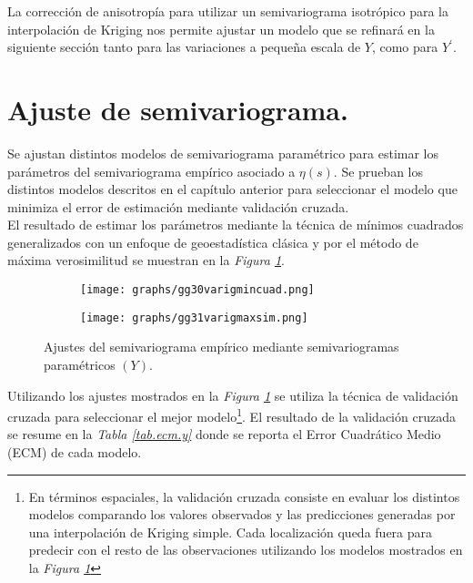 \documentclass[11pt, oneside]{book}
\begin{document}
La corrección de anisotropía para utilizar un semivariograma isotrópico para la interpolación de Kriging nos permite ajustar un modelo que se refinará en la siguiente sección tanto para las variaciones a pequeña escala de $Y$, como para $Y^{'}$.

\newpage

\section{Ajuste de semivariograma.}
Se ajustan distintos modelos de semivariograma paramétrico para estimar los parámetros del semivariograma empírico asociado a $\eta(s)$. Se prueban los distintos modelos descritos en el capítulo anterior para seleccionar el modelo que minimiza el error de estimación mediante validación cruzada.\\

El resultado de estimar los parámetros mediante la técnica de mínimos cuadrados generalizados con un enfoque de geoestadística clásica y por el método de máxima verosimilitud se muestran en la \emph{Figura \ref{fig30y31.ajusvary}}.

  \begin{figure}[ht]
  \begin{subfigure}{.5\textwidth}
	  \centering
	  \texttt{[image: graphs/gg30varigmincuad.png]}
	\end{subfigure}%
	\begin{subfigure}{.5\textwidth}
	  \centering
    \texttt{[image: graphs/gg31varigmaxsim.png]}
	\end{subfigure}
  \caption{Ajustes del semivariograma empírico mediante semivariogramas paramétricos $(Y)$.}
    \label{fig30y31.ajusvary}
\end{figure}

Utilizando los ajustes mostrados en la \emph{Figura \ref{fig30y31.ajusvary}} se utiliza la técnica de validación cruzada para seleccionar el mejor modelo\footnote{En términos espaciales, la validación cruzada consiste en evaluar los distintos modelos comparando los valores observados y las predicciones generadas por una interpolación de Kriging simple. Cada localización queda fuera para predecir con el resto de las observaciones utilizando los modelos mostrados en la \emph{Figura \ref{fig30y31.ajusvary}}}. El resultado de la validación cruzada se resume en la \emph{Tabla \ref{tab.ecm.y}} donde se reporta el Error Cuadrático Medio (ECM) de cada modelo.\\
\end{document}
